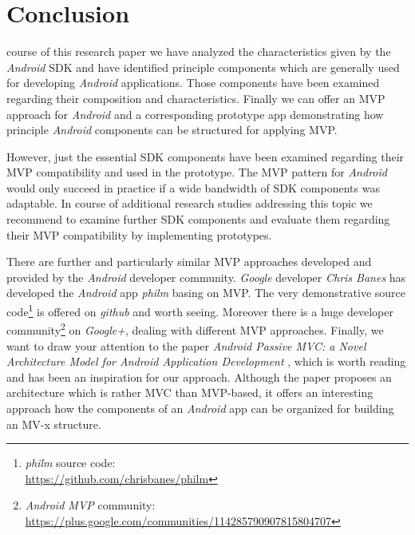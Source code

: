 \section{Conclusion}

 course of this research paper we have analyzed the characteristics given by the \emph{Android} SDK and have identified 
principle components which are generally used for developing \emph{Android} applications. Those components have been examined regarding their composition and characteristics. 
Finally we can offer an MVP approach for \emph{Android} and a corresponding prototype app demonstrating how principle \emph{Android} components can be structured for applying MVP.

However, just the essential SDK components have been examined regarding their MVP compatibility and used in the prototype. 
The MVP pattern for \emph{Android} would only succeed in practice if a wide bandwidth of SDK components was adaptable. 
In course of additional research studies addressing this topic we recommend to examine further SDK components and 
evaluate them regarding their MVP compatibility by implementing prototypes.

There are further and particularly similar MVP approaches developed and provided by the \emph{Android} developer community. 
\emph{Google} developer \emph{Chris Banes} has developed the \emph{Android} app \emph{philm} basing on MVP. 
The very demonstrative source code\footnote{\emph{philm} source code: \\\url{https://github.com/chrisbanes/philm}} is offered on \emph{github} and worth seeing. 
Moreover there is a huge developer community\footnote{\emph{Android MVP} community:\\\url{https://plus.google.com/communities/114285790907815804707}} on \emph{Google+}, dealing with different MVP approaches. 
Finally, we want to draw your attention to the paper \emph{Android Passive MVC: a Novel Architecture Model for Android Application Development} \cite{PassiveMVC}, which is worth reading and has been an inspiration for our approach. Although the paper proposes an architecture which is rather MVC than MVP-based, 
it offers an interesting approach how the components of an \emph{Android} app can be organized for building an MV-x structure. 